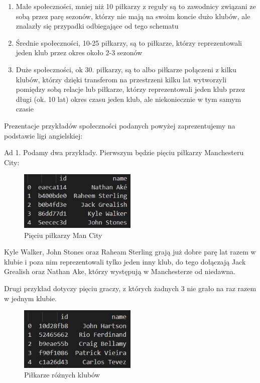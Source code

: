\documentclass{article}
\begin{document}
\begin{enumerate}
    \item Małe społeczności, mniej niż 10 piłkarzy z reguły są to zawodnicy związani ze sobą przez parę sezonów, którzy nie mają na swoim koncie dużo klubów, ale znalazły się przypadki odbiegające od tego schematu
    \item Średnie społeczności, 10-25 piłkarzy, są to piłkarze, którzy reprezentowali jeden klub przez okres około 2-3 sezonów
    \item Duże społeczności, ok 30. piłkarzy, są to albo piłkarze połączeni z kilku klubów, którzy dzięki transferom na przestrzeni kilku lat wytworzyli pomiędzy sobą relacje lub piłkarze, którzy reprezentowali jeden klub przez długi (ok. 10 lat) okres czasu jeden klub, ale niekoniecznie w tym samym czasie
\end{enumerate}

Prezentacje przykładów społeczności podanych powyżej zaprezentujemy na podstawie ligi angielskiej:

Ad 1. Podamy dwa przykłady. Pierwszym będzie pięciu piłkarzy Manchesteru City: 

\begin{figure}[H]
    \centering
    \includegraphics[width=0.5\textwidth]{images/city.png}
    \caption{Pięciu piłkarzy Man City}
    \label{fig:my_label}
\end{figure}

Kyle Walker, John Stones oraz Raheam Sterling grają już dobre parę lat razem w klubie i poza nim reprezentowali tylko jeden inny klub, do tego dołączają Jack Grealish oraz Nathan Ake, którzy występują w Manchesterze od niedawna.

Drugi przykład dotyczy pięciu graczy, z których żadnych 3 nie grało na raz razem w jednym klubie.

\begin{figure}[H]
    \centering
    \includegraphics[width=0.5\textwidth]{images/vieira.png}
    \caption{Piłkarze różnych klubów}
    \label{fig:my_label}
\end{figure}
\end{document}
